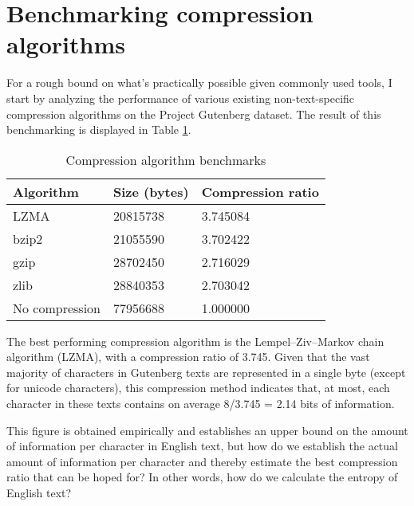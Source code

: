 \section{Benchmarking compression algorithms}

For a rough bound on what's practically possible given commonly used tools, I start by analyzing the performance of various existing non-text-specific compression algorithms on the Project Gutenberg dataset. The result of this benchmarking is displayed in Table \ref{tab:compalg_benchmarks}.

\begin{table}[ht]
\centering
\begin{tabular}{ |p{3cm}||p{4cm}|p{3cm}|  }
 \hline
 Algorithm & Size (bytes) & Compression ratio\\
 \hline
    LZMA & 20815738 & 3.745084\\
    bzip2 & 21055590 & 3.702422\\
    gzip & 28702450 & 2.716029\\
    zlib & 28840353 & 2.703042\\
    No compression & 77956688 & 1.000000\\
 \hline
\end{tabular}
\caption{Compression algorithm benchmarks
\label{tab:compalg_benchmarks}}
\end{table}

The best performing compression algorithm is the Lempel–Ziv–Markov chain algorithm (LZMA), with a compression ratio of 3.745. Given that the vast majority of characters in Gutenberg texts are represented in a single byte (except for unicode characters), this compression method indicates that, at most, each character in these texts contains on average 8/3.745 = 2.14 bits of information.

This figure is obtained empirically and establishes an upper bound on the amount of information per character in English text, but how do we establish the actual amount of information per character and thereby estimate the best compression ratio that can be hoped for? In other words, how do we calculate the entropy of English text?

%
